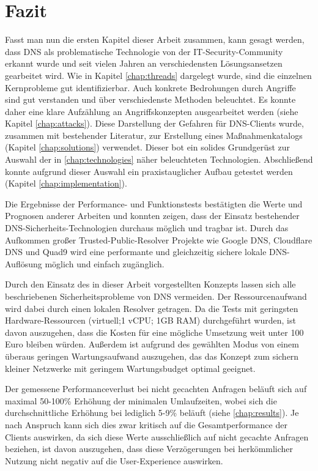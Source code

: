\chapter{Fazit}
\label{chap:conclusion}
Fasst man nun die ersten Kapitel dieser Arbeit zusammen, kann gesagt werden, dass DNS als problematische Technologie von der IT-Security-Community erkannt wurde und seit vielen Jahren an verschiedensten Lösungsansetzen gearbeitet wird. Wie in Kapitel \ref{chap:threads} dargelegt wurde, sind die einzelnen Kernprobleme gut identifizierbar. Auch konkrete Bedrohungen durch Angriffe sind gut verstanden und über verschiedenste Methoden beleuchtet. Es konnte daher eine klare Aufzählung an Angriffskonzepten ausgearbeitet werden (siehe Kapitel \ref{chap:attacks}). Diese Darstellung der Gefahren für DNS-Clients wurde, zusammen mit bestehender Literatur, zur Erstellung eines Maßnahmenkatalogs (Kapitel \ref{chap:solutions}) verwendet. Dieser bot ein solides Grundgerüst zur Auswahl der in \ref{chap:technologies} näher beleuchteten Technologien. Abschließend konnte aufgrund dieser Auswahl ein praxistauglicher Aufbau getestet werden (Kapitel \ref{chap:implementation}). 

Die Ergebnisse der Performance- und Funktionstests bestätigten die Werte und Prognosen anderer Arbeiten und konnten zeigen, dass der Einsatz bestehender DNS-Sicherheits-Technologien durchaus möglich und tragbar ist. Durch das Aufkommen großer Trusted-Public-Resolver Projekte wie Google DNS, Cloudflare DNS und Quad9 wird eine performante und gleichzeitig sichere lokale DNS-Auflösung möglich und einfach zugänglich. 

Durch den Einsatz des in dieser Arbeit vorgestellten Konzepts lassen sich alle beschriebenen Sicherheitsprobleme von DNS vermeiden. Der Ressourcenaufwand wird dabei durch einen lokalen Resolver getragen. Da die Tests mit geringsten Hardware-Ressourcen (virtuell;1 vCPU; 1GB RAM) durchgeführt wurden, ist davon auszugehen, dass die Kosten für eine mögliche Umsetzung weit unter 100 Euro bleiben würden. Außerdem ist aufgrund des gewählten Modus von einem überaus geringen Wartungsaufwand auszugehen, das das Konzept zum sichern kleiner Netzwerke mit geringem Wartungsbudget optimal geeignet.

Der gemessene Performanceverlust bei nicht gecachten Anfragen beläuft sich auf maximal 50-100\% Erhöhung der minimalen Umlaufzeiten, wobei sich die durchschnittliche Erhöhung bei lediglich 5-9\% beläuft  (siehe \ref{chap:results}). Je nach Anspruch kann sich dies zwar kritisch auf die Gesamtperformance der Clients auswirken, da sich diese Werte ausschließlich auf nicht gecachte Anfragen beziehen, ist davon auszugehen, dass diese Verzögerungen bei herkömmlicher Nutzung nicht negativ auf die User-Experience auswirken.

